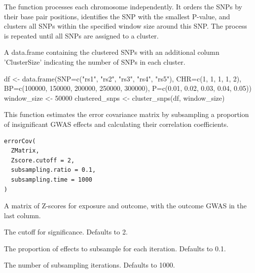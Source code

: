 \documentclass[a4paper]{book}
\begin{document}
%
\begin{Details}
The function processes each chromosome independently. It orders the SNPs by their base pair positions, identifies
the SNP with the smallest P-value, and clusters all SNPs within the specified window size around this SNP. The process
is repeated until all SNPs are assigned to a cluster.
\end{Details}
%
\begin{Value}
A data.frame containing the clustered SNPs with an additional column 'ClusterSize' indicating the number of SNPs in each cluster.
\end{Value}
%
\begin{Examples}
\begin{ExampleCode}
df <- data.frame(SNP=c("rs1", "rs2", "rs3", "rs4", "rs5"),
                 CHR=c(1, 1, 1, 1, 2),
                 BP=c(100000, 150000, 200000, 250000, 300000),
                 P=c(0.01, 0.02, 0.03, 0.04, 0.05))
window_size <- 50000
clustered_snps <- cluster_snps(df, window_size)

\end{ExampleCode}
\end{Examples}
%
\begin{Description}
This function estimates the error covariance matrix by subsampling a proportion of insignificant GWAS effects and calculating their correlation coefficients.
\end{Description}
%
\begin{Usage}
\begin{verbatim}
errorCov(
  ZMatrix,
  Zscore.cutoff = 2,
  subsampling.ratio = 0.1,
  subsampling.time = 1000
)
\end{verbatim}
\end{Usage}
%
\begin{Arguments}
\begin{ldescription}
\item[\code{ZMatrix}] A matrix of Z-scores for exposure and outcome, with the outcome GWAS in the last column.

\item[\code{Zscore.cutoff}] The cutoff for significance. Defaults to 2.

\item[\code{subsampling.ratio}] The proportion of effects to subsample for each iteration. Defaults to 0.1.

\item[\code{subsampling.time}] The number of subsampling iterations. Defaults to 1000.
\end{ldescription}
\end{Arguments}
\end{document}
